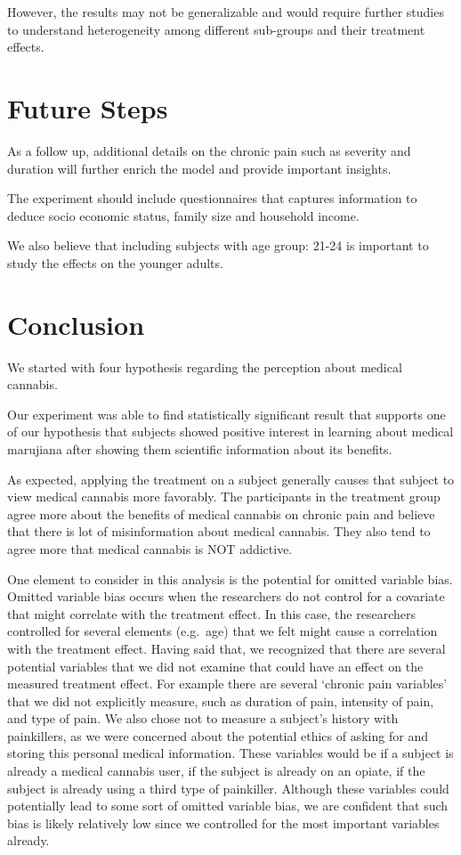 \documentclass[
]{article}
\begin{document}
However, the results may not be generalizable and would require further
studies to understand heterogeneity among different sub-groups and their
treatment effects.

\hypertarget{future-steps}{%
\section{Future Steps}\label{future-steps}}

As a follow up, additional details on the chronic pain such as severity
and duration will further enrich the model and provide important
insights.

The experiment should include questionnaires that captures information
to deduce socio economic status, family size and household income.

We also believe that including subjects with age group: 21-24 is
important to study the effects on the younger adults.

\hypertarget{conclusion}{%
\section{Conclusion}\label{conclusion}}

We started with four hypothesis regarding the perception about medical
cannabis.

Our experiment was able to find statistically significant result that
supports one of our hypothesis that subjects showed positive interest in
learning about medical marujiana after showing them scientific
information about its benefits.

As expected, applying the treatment on a subject generally causes that
subject to view medical cannabis more favorably. The participants in the
treatment group agree more about the benefits of medical cannabis on
chronic pain and believe that there is lot of misinformation about
medical cannabis. They also tend to agree more that medical cannabis is
NOT addictive.

One element to consider in this analysis is the potential for omitted
variable bias. Omitted variable bias occurs when the researchers do not
control for a covariate that might correlate with the treatment effect.
In this case, the researchers controlled for several elements (e.g.~age)
that we felt might cause a correlation with the treatment effect. Having
said that, we recognized that there are several potential variables that
we did not examine that could have an effect on the measured treatment
effect. For example there are several `chronic pain variables' that we
did not explicitly measure, such as duration of pain, intensity of pain,
and type of pain. We also chose not to measure a subject's history with
painkillers, as we were concerned about the potential ethics of asking
for and storing this personal medical information. These variables would
be if a subject is already a medical cannabis user, if the subject is
already on an opiate, if the subject is already using a third type of
painkiller. Although these variables could potentially lead to some sort
of omitted variable bias, we are confident that such bias is likely
relatively low since we controlled for the most important variables
already.
\end{document}

